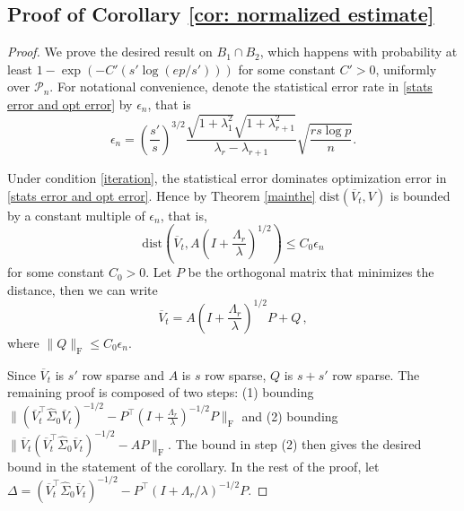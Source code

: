 \documentclass[11pt]{article}
\newcommand{\festimate}{\widehat{A}_t}
\newcommand{\gd}{\overline{V}}
\newcommand{\dist}{\mathrm{dist}}
\newcommand{\so}{\widehat{\Sigma}_0}
\newcommand{\0}{{\mathbf{0}}}
\begin{document}
\subsection{Proof of Corollary \ref{cor: normalized estimate}}
\begin{proof}
We prove the desired result on $B_1\cap B_2$, which happens with probability at least $1-\exp(-C'(s'\log(ep/s')))$ for some constant $C'>0$,  uniformly over $\mathcal{P}_n$.  
For notational convenience,
denote the statistical error rate in \eqref{stats error and opt error} by $\epsilon_n$, that is
\begin{equation*}
\epsilon_n = \left(\frac{s'}{s}\right)^{3/2}\frac{\sqrt{1+\lambda_1^2}\sqrt{{1+\lambda_{r+1}^2}}}{\lambda_r-\lambda_{r+1}}\sqrt{\frac{rs\log p}{n}}.
\end{equation*} 
\iffalse
By triangle inequality, we have\begin{equation*}
\mathrm{dist}(\festimate(I+\frac{\Lambda_r}{\lambda})^{1/2}, A(I+\frac{\Lambda_r}{\lambda})^{1/2})\leq \dist(\festimate(I+\frac{\Lambda_r}{\lambda})^{1/2}, \gd_t)+\dist(A(I+\frac{\Lambda_r}{\lambda})^{1/2},\gd_t).
\end{equation*}\fi


Under condition \eqref{iteration}, the statistical error dominates optimization error in \eqref{stats error and opt error}. 
Hence by Theorem \ref{mainthe} $\dist(\gd_t,V)$ is bounded by a constant multiple of $\epsilon_n$, that is, 
\begin{equation*}
\dist\left(\gd_t,A\left(I+\frac{\Lambda_r}{\lambda}\right)^{1/2}\right)\leq C_0\epsilon_n 
\end{equation*}
for some constant $C_0 > 0$. 
Let $P$ be the orthogonal matrix that minimizes the distance, then we can write
\begin{equation}
      \label{eq:Q}
\gd_t=A\left(I+\frac{\Lambda_r}{\lambda}\right)^{1/2}P+Q\,,
\end{equation}
where $\|Q\|_\mathrm{F}\leq C_0\epsilon_n.$ 


Since $\gd_t$ is $s'$ row sparse and $A$ is $s$ row sparse, 
$Q$ is $s+s'$ row sparse. 
The remaining proof is composed of two steps: 
(1) bounding $\|(\gd_t^\top\so\gd_t)^{-1/2}-P^\top(I+\frac{\Lambda_r}{\lambda})^{-1/2}P\|_\mathrm{F}$ and 
(2) bounding $\|\gd_t(\gd_t^\top\so\gd_t)^{-1/2}-AP\|_\mathrm{F}$.
The bound in step (2) then gives the desired bound in the statement of the corollary.
In the rest of the proof, let $\Delta=(\gd_t^\top\so\gd_t)^{-1/2}-P^\top(I+\Lambda_r/\lambda)^{-1/2}P$.


\end{proof}
\end{document}
